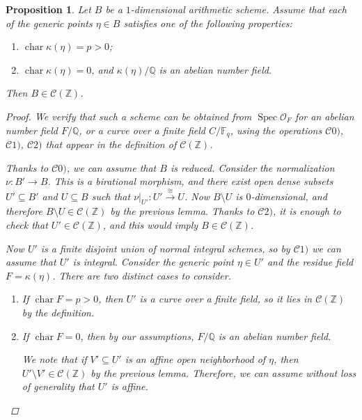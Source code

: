 \documentclass[10pt,a4paper,oneside,draft]{article}
\DeclareMathOperator{\fchar}{char}
\DeclareMathOperator{\Spec}{Spec}
\newcommand{\FF}{\mathbb{F}}
\newcommand{\QQ}{\mathbb{Q}}
\newcommand{\ZZ}{\mathbb{Z}}
\theoremstyle{myplain}
\newtheorem{proposition}[theorem]{Proposition}
\theoremstyle{mydefinition}
\numberwithin{equation}{section}
\begin{document}
\begin{proposition}
  \label{prop:particular-cases-1-dim-base}
  Let $B$ be a $1$-dimensional arithmetic scheme. Assume that each of the
  generic points $\eta \in B$ satisfies one of the following properties:
  \begin{enumerate}
  \item[a)] $\fchar \kappa (\eta) = p > 0$;

  \item[b)] $\fchar \kappa (\eta) = 0$, and $\kappa (\eta)/\QQ$ is an abelian
    number field.
  \end{enumerate}
  Then $B \in \mathcal{C} (\ZZ)$.

  \begin{proof}
    We verify that such a scheme can be obtained from $\Spec \mathcal{O}_F$ for
    an abelian number field $F/\QQ$, or a curve over a finite field $C/\FF_q$,
    using the operations $\mathcal{C}0)$, $\mathcal{C}1)$, $\mathcal{C}2)$ that
    appear in the definition of $\mathcal{C} (\ZZ)$.

    Thanks to $\mathcal{C}0)$, we can assume that $B$ is reduced. Consider the
    normalization $\nu\colon B' \to B$. This is a birational morphism, and there
    exist open dense subsets $U' \subseteq B'$ and $U \subseteq B$ such that
    $\left.\nu\right|_{U'}\colon U' \xrightarrow{\cong} U$. Now $B\setminus U$
    is $0$-dimensional, and therefore $B\setminus U \in \mathcal{C} (\ZZ)$ by
    the previous lemma. Thanks to $\mathcal{C}2)$, it is enough to check that
    $U' \in \mathcal{C} (\ZZ)$, and this would imply $B \in \mathcal{C} (\ZZ)$.

    Now $U'$ is a finite disjoint union of normal integral schemes, so by
    $\mathcal{C}1)$ we can assume that $U'$ is integral. Consider the generic
    point $\eta \in U'$ and the residue field $F = \kappa (\eta)$. There are two
    distinct cases to consider.

    \begin{enumerate}
    \item[a)] If $\fchar F = p > 0$, then $U'$ is a curve over a finite field,
      so it lies in $\mathcal{C} (\ZZ)$ by the definition.

    \item[b)] If $\fchar F = 0$, then by our assumptions, $F/\QQ$ is an abelian
      number field.

      We note that if $V' \subseteq U'$ is an affine open neighborhood of
      $\eta$, then $U'\setminus V' \in \mathcal{C} (\ZZ)$ by the previous
      lemma. Therefore, we can assume without loss of generality that $U'$ is
      affine.


\end{enumerate}
\end{proof}
\end{proposition}
\end{document}
